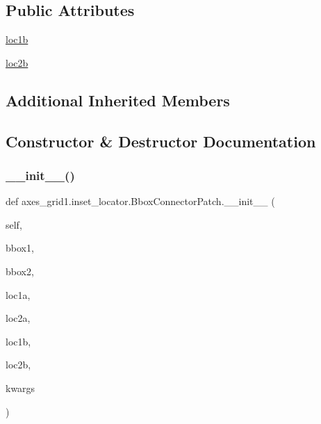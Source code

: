 \subsection*{Public Attributes}
\begin{DoxyCompactItemize}
\item 
\hyperlink{classaxes__grid1_1_1inset__locator_1_1BboxConnectorPatch_a08064f4f6cbf2a6839d434313c59ce92}{loc1b}
\item 
\hyperlink{classaxes__grid1_1_1inset__locator_1_1BboxConnectorPatch_aa9eeb94282e8dbe4c15d1d7e1f2b7299}{loc2b}
\end{DoxyCompactItemize}
\subsection*{Additional Inherited Members}


\subsection{Constructor \& Destructor Documentation}
\mbox{\label{classaxes__grid1_1_1inset__locator_1_1BboxConnectorPatch_ad6a0fc5a7438f4c6b402a6006e953e9c}} 
\subsubsection{\texorpdfstring{\+\_\+\+\_\+init\+\_\+\+\_\+()}{\_\_init\_\_()}}
{\footnotesize\ttfamily def axes\+\_\+grid1.\+inset\+\_\+locator.\+Bbox\+Connector\+Patch.\+\_\+\+\_\+init\+\_\+\+\_\+ (\begin{DoxyParamCaption}\item[{}]{self,  }\item[{}]{bbox1,  }\item[{}]{bbox2,  }\item[{}]{loc1a,  }\item[{}]{loc2a,  }\item[{}]{loc1b,  }\item[{}]{loc2b,  }\item[{}]{kwargs }\end{DoxyParamCaption})}

